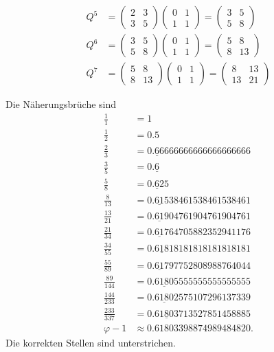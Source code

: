 \begin{loesung}
\begin{teilaufgaben}
\begin{align*}
Q^5
&=
\begin{pmatrix}
 2 & 3 \\
 3 & 5
\end{pmatrix}
\begin{pmatrix}
0&1\\
1&1
\end{pmatrix}
=
\begin{pmatrix}
 3 & 5 \\
 5 & 8
\end{pmatrix}
\\
Q^6
&=
\begin{pmatrix}
 3 & 5 \\
 5 & 8
\end{pmatrix}
\begin{pmatrix}
0&1\\
1&1
\end{pmatrix}
=
\begin{pmatrix}
 5 & 8\\
 8 & 13
\end{pmatrix}
\\
Q^7
&=
\begin{pmatrix}
 5 & 8 \\
 8 & 13
\end{pmatrix}
\begin{pmatrix}
0&1\\
1&1
\end{pmatrix}
=
\begin{pmatrix}
 8  & 13 \\
 13 & 21
\end{pmatrix}
\end{align*}
\item
Die Näherungsbrüche sind
\begin{align*}
\frac{1}{1}     &= 1                                  \\
\frac{1}{2}     &= 0.5                                \\
\frac{2}{3}     &= 0.\underline{6}6666666666666666666 \\
\frac{3}{5}     &= 0.\underline{6}                    \\
\frac{5}{8}     &= 0.\underline{6}25                  \\
\frac{8}{13}    &= 0.\underline{61}538461538461538461 \\
\frac{13}{21}   &= 0.\underline{61}904761904761904761 \\
\frac{21}{34}   &= 0.\underline{61}764705882352941176 \\
\frac{34}{55}   &= 0.\underline{618}18181818181818181 \\
\frac{55}{89}   &= 0.\underline{61}797752808988764044 \\
\frac{89}{144}  &= 0.\underline{6180}5555555555555555 \\
\frac{144}{233} &= 0.\underline{6180}2575107296137339 \\
\frac{233}{337} &= 0.\underline{61803}713527851458885 \\
\varphi-1       &\approx 0.61803398874989484820.
\end{align*}
Die korrekten Stellen sind unterstrichen.
\qedhere
\end{teilaufgaben}
\end{loesung}

